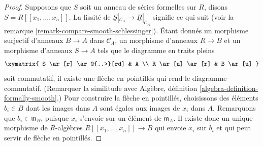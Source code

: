 \begin{proof}
Supposons que $S$ soit un anneau de séries formelles sur $R$, disons
$S = R[[x_1, \ldots, x_n]]$. La lissité de
$\underline{S}|_{\mathcal{C}_\Lambda} \to \underline{R}|_{\mathcal{C}_\Lambda}$
signifie ce qui suit (voir la remarque
\ref{remark-compare-smooth-schlessinger}). Étant donnés un morphisme
surjectif d'anneaux $B \to A$ dans $\mathcal{C}_\Lambda$, un morphisme
d'anneaux $R \to B$ et un morphisme d'anneaux $S \to A$ tels que le diagramme
en traits pleins
$$
\xymatrix{
S \ar[r] \ar@{..>}[rd] & A \\
R \ar[u] \ar[r] & B \ar[u]
}
$$
soit commutatif, il existe une flèche en pointillés qui rend le diagramme
commutatif. (Remarquer la similitude avec Algèbre, définition
\ref{algebra-definition-formally-smooth}.) Pour construire la flèche en
pointillés, choisissons des éléments $b_i \in B$ dont les images dans $A$
sont égales aux images de $x_i$ dans $A$. Remarquons que
$b_i \in \mathfrak m_B$, puisque $x_i$ s'envoie sur un élément de
$\mathfrak m_A$. Il existe donc un unique morphisme de $R$-algèbres
$R[[x_1, \ldots, x_n]] \to B$ qui envoie $x_i$ sur $b_i$ et qui peut servir
de flèche en pointillés.


\end{proof}
